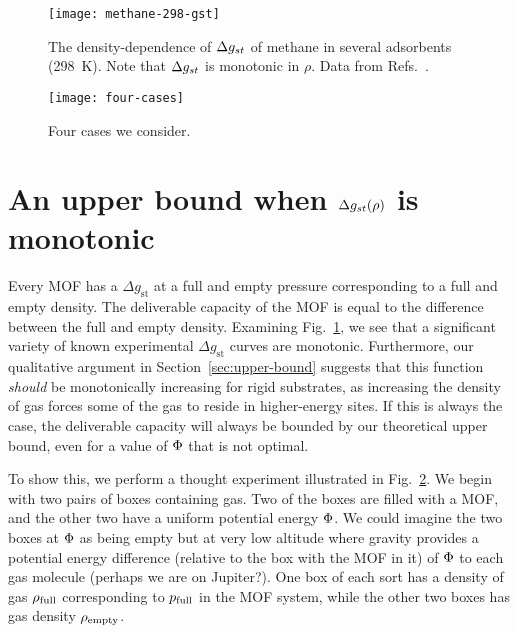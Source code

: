 \begin{figure}
    \centering
    \texttt{[image: methane-298-gst]}
    \caption{The density-dependence of $\Delta g_{st}$ of methane in several
      adsorbents (298\ K). Note that $\Delta g_{st}$ is monotonic in
      $\rho$. Data from
      Refs.~\cite{mason2014evaluating, furukawa2009storage}.
    }
    \label{fig:methane-gst}
\end{figure}

\begin{figure}
    \centering
    \texttt{[image: four-cases]}
    \caption{Four cases we consider. }
    \label{fig:delta-gst-maximum}
\end{figure}

\section{An upper bound when $\Delta g_{st}(\rho)$ is monotonic}\label{sec:monotonic}
Every MOF has a $\Delta g_\text{st}$ at a full and empty pressure corresponding to a full and empty density. The deliverable capacity of the MOF is equal to the difference between the full and empty density.
Examining Fig.~\ref{fig:methane-gst}, we see that a significant variety of known experimental $\Delta g_\text{st}$ curves are monotonic.  Furthermore, our qualitative argument in Section~\ref{sec:upper-bound} suggests that this function \emph{should} be monotonically increasing for rigid substrates, as increasing the density of gas forces some of the gas to reside in higher-energy sites.  If this is always the case, the deliverable capacity will always be bounded by our theoretical upper bound, even for a value of $\Phi$ that is not optimal.

To show this, we perform a thought experiment illustrated in Fig.~\ref{fig:delta-gst-maximum}.  We begin with two pairs of boxes containing gas.  Two of the boxes are filled with a MOF, and the other two have a uniform potential energy $\Phi$.  We could imagine the two boxes at $\Phi$ as being empty but at very low altitude where gravity provides a potential energy difference (relative to the box with the MOF in it) of $\Phi$ to each gas molecule (perhaps we are on Jupiter?).  One box of each sort has a density of gas $\rho_{\text{full}}$ corresponding to $p_{\text{full}}$ in the MOF system, while the other two boxes has gas density $\rho_{\text{empty}}$.

